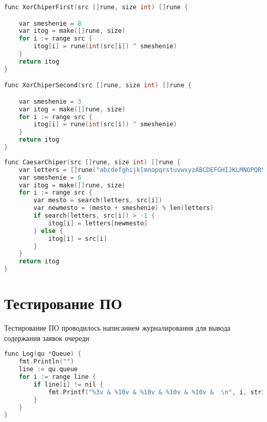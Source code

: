 \par \text{ }
\par \text{ }
\par \text{ }
\par \text{ }
\par \text{ }
\par \text{  }
\begin{lstlisting}[language=C++, label=lst:alg:Xor, caption=Реализация алгоритма XOR шифрования]
func XorChiperFirst(src []rune, size int) []rune {

    var smeshenie = 8
    var itog = make([]rune, size)
    for i := range src {
        itog[i] = rune(int(src[i]) ^ smeshenie)
    }
    return itog
}

func XorChiperSecond(src []rune, size int) []rune {

    var smeshenie = 3
    var itog = make([]rune, size)
    for i := range src {
        itog[i] = rune(int(src[i]) ^ smeshenie)
    }
    return itog
}
\end{lstlisting}
\par \text{ }
\begin{lstlisting}[language=C++, label=lst:alg:Caesar, caption=Реализация алгоритма шифра Цезаря]
func CaesarChiper(src []rune, size int) []rune {
    var letters = []rune("abcdefghijklmnopqrstuvwxyzABCDEFGHIJKLMNOPQRSTUVWXYZ")
    var smeshenie = 6
    var itog = make([]rune, size)
    for i := range src {
        var mesto = search(letters, src[i])
        var newmesto = (mesto + smeshenie) % len(letters)
        if search(letters, src[i]) > -1 {
            itog[i] = letters[newmesto]
        } else {
            itog[i] = src[i]
        }
    }
    return itog
}
        \end{lstlisting}

        
    \section{Тестирование ПО}

        Тестирование ПО проводилось написанием журналирования для вывода
        содержания заявок очереди
        \par \text{  }
\begin{lstlisting}[language=C++, label=lst:testing, caption=Тестирование ПО]
func Log(qu *Queue) {
    fmt.Println("")
    line := qu.queue
    for i := range line {
        if line[i] != nil {
            fmt.Printf("%3v & %10v & %10v & %10v & %10v &  \n", i, string(line[i].source), string(line[i].dst1), string(line[i].dst2), string(line[i].dst3))
        }
    }
}
        \end{lstlisting}

